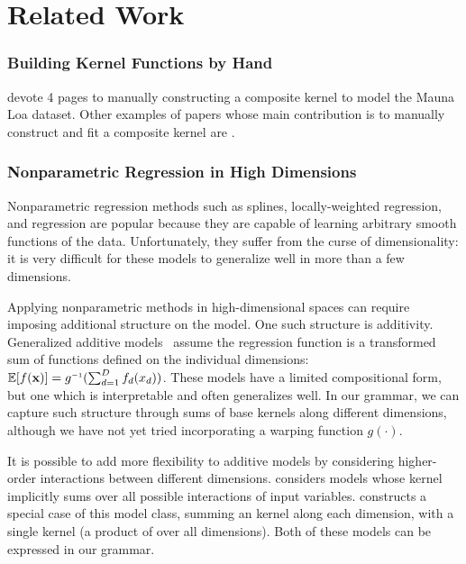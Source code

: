 




\section{Related Work}
\label{sec:gpss-related-work}

\def\rwsheader{\subsubsection}

\rwsheader{Building Kernel Functions by Hand}
\citet[Chapter 5]{rasmussen38gaussian} devote 4 pages to manually constructing a composite kernel to model the Mauna Loa dataset.
Other examples of papers whose main contribution is to manually construct and fit a composite \gp{} kernel are \citet{EdgarTelescope,lloydgefcom2012,textperiodic13}.


\rwsheader{Nonparametric Regression in High Dimensions}
Nonparametric regression methods such as splines, locally-weighted regression, and \gp{} regression are popular because they are capable of learning arbitrary smooth functions of the data.
Unfortunately, they suffer from the curse of dimensionality: it is very difficult for these models to generalize well in more than a few dimensions.

Applying nonparametric methods in high-dimensional spaces can require imposing additional structure on the model.
One such structure is additivity.
Generalized additive models~\citep{hastie1990generalized} assume the regression function is a transformed sum of functions defined on the individual dimensions: $\expect[f(\vx)] = g\inv(\sum_{d=1}^D f_d(x_d))$.
These models have a limited compositional form, but one which is interpretable and often generalizes well.
In our grammar, we can capture such structure through sums of base kernels along different dimensions, although we have not yet tried incorporating a warping function $g(\cdot)$.

It is possible to add more flexibility to additive models by considering higher-order interactions between different dimensions. 
 considers \gp{} models whose kernel implicitly sums over all possible interactions of input variables.
\citet{plate1999accuracy} constructs a special case of this model class, summing an \kSE{} kernel along each dimension, with a single \seard{} kernel (a product of \kSE{} over all dimensions).
Both of these models can be expressed in our grammar.

